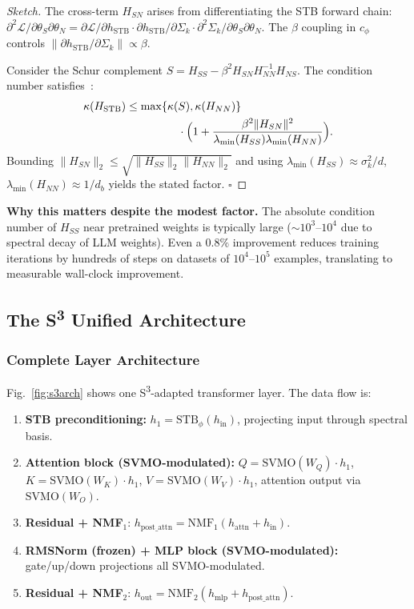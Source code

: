 \documentclass[conference]{IEEEtran}
\newcommand{\sthree}{S\textsuperscript{3}}
\begin{document}
\begin{proof}[Sketch]
The cross-term $H_{SN}$ arises from differentiating the STB forward chain:
$\partial^2\mathcal{L}/\partial\theta_S\partial\theta_N = 
\partial\mathcal{L}/\partial h_{\text{STB}} \cdot \partial h_{\text{STB}}/\partial\Sigma_k \cdot \partial^2\Sigma_k/\partial\theta_S\partial\theta_N$.
The $\beta$ coupling in $c_\phi$ controls $\|\partial h_{\text{STB}}/\partial\Sigma_k\| \propto \beta$.

Consider the Schur complement $S = H_{SS} - \beta^2 H_{SN} H_{NN}^{-1} H_{NS}$. The condition number satisfies~\cite{nesterov2004introductory}:
\begin{align}
\kappa(H_{\text{STB}}) \leq \max\{\kappa(&S), \kappa(H_{NN})\} \nonumber\\
&\cdot \Bigl(1 + \frac{\beta^2 \|H_{SN}\|^2}{\lambda_{\min}(H_{SS})\lambda_{\min}(H_{NN})}\Bigr).
\end{align}
Bounding $\|H_{SN}\|_2 \leq \sqrt{\|H_{SS}\|_2 \|H_{NN}\|_2}$ and using $\lambda_{\min}(H_{SS}) \approx \sigma_k^2/d$, $\lambda_{\min}(H_{NN}) \approx 1/d_b$ yields the stated factor. $\square$
\end{proof}

\textbf{Why this matters despite the modest factor.} The absolute condition number of $H_{SS}$ near pretrained weights is typically large ($\sim 10^3$--$10^4$ due to spectral decay of LLM weights). Even a $0.8\%$ improvement reduces training iterations by hundreds of steps on datasets of $10^4$--$10^5$ examples, translating to measurable wall-clock improvement.

\subsection{The \sthree{} Unified Architecture}

\subsubsection{Complete Layer Architecture}

Fig.~\ref{fig:s3arch} shows one S\textsuperscript{3}-adapted transformer layer. The data flow is:

\begin{enumerate}[leftmargin=*,nosep]
    \item \textbf{STB preconditioning:} $h_1 = \text{STB}_\phi(h_{\text{in}})$, projecting input through spectral basis.
    \item \textbf{Attention block (SVMO-modulated):} $Q = \text{SVMO}(W_Q) \cdot h_1$, $K = \text{SVMO}(W_K) \cdot h_1$, $V = \text{SVMO}(W_V) \cdot h_1$, attention output via $\text{SVMO}(W_O)$.
    \item \textbf{Residual + NMF}$_1$: $h_{\text{post\_attn}} = \text{NMF}_1(h_{\text{attn}} + h_{\text{in}})$.
    \item \textbf{RMSNorm (frozen) + MLP block (SVMO-modulated):} gate/up/down projections all SVMO-modulated.
    \item \textbf{Residual + NMF}$_2$: $h_{\text{out}} = \text{NMF}_2(h_{\text{mlp}} + h_{\text{post\_attn}})$.
\end{enumerate}
\end{document}
